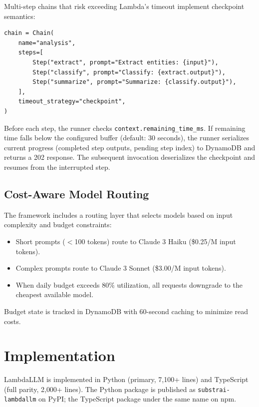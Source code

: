 \documentclass[10pt,twocolumn,letterpaper]{article}
\begin{document}
Multi-step chains that risk exceeding Lambda's timeout implement checkpoint semantics:

\begin{lstlisting}
chain = Chain(
    name="analysis",
    steps=[
        Step("extract", prompt="Extract entities: {input}"),
        Step("classify", prompt="Classify: {extract.output}"),
        Step("summarize", prompt="Summarize: {classify.output}"),
    ],
    timeout_strategy="checkpoint",
)
\end{lstlisting}

Before each step, the runner checks \texttt{context.remaining\_time\_ms}. If remaining time falls below the configured buffer (default: 30 seconds), the runner serializes current progress (completed step outputs, pending step index) to DynamoDB and returns a 202 response. The subsequent invocation deserializes the checkpoint and resumes from the interrupted step.

\subsection{Cost-Aware Model Routing}

The framework includes a routing layer that selects models based on input complexity and budget constraints:

\begin{itemize}[leftmargin=*,itemsep=2pt,topsep=2pt]
    \item Short prompts ($<$100 tokens) route to Claude 3 Haiku (\$0.25/M input tokens).
    \item Complex prompts route to Claude 3 Sonnet (\$3.00/M input tokens).
    \item When daily budget exceeds 80\% utilization, all requests downgrade to the cheapest available model.
\end{itemize}

Budget state is tracked in DynamoDB with 60-second caching to minimize read costs.

\section{Implementation}

LambdaLLM is implemented in Python (primary, 7{,}100+ lines) and TypeScript (full parity, 2{,}000+ lines). The Python package is published as \texttt{substrai-lambdallm} on PyPI; the TypeScript package under the same name on npm.
\end{document}
